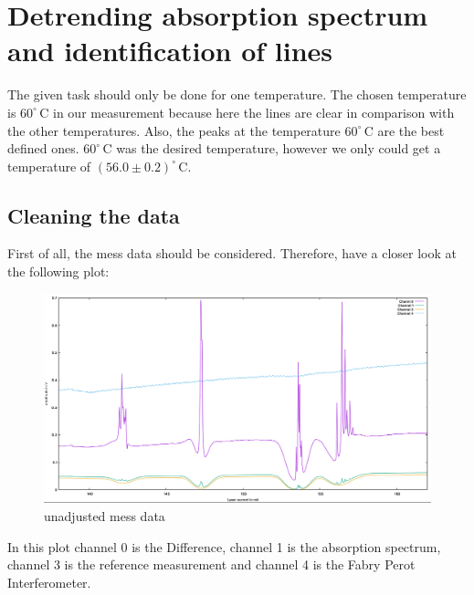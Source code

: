 \section{Detrending absorption spectrum and identification of lines}
The given task should only be done for one temperature. The chosen temperature is $60^\circ\,$C in our measurement because here 
the lines are clear in comparison with the other temperatures. Also, the peaks at the temperature $60^\circ\,$C are the best defined ones. 
$60^\circ\,$C was the desired temperature, however we only could get a temperature of $(56.0\pm 0.2)^\circ\,$C.\\
\subsection{Cleaning the data}
First of all, the mess data should be considered. Therefore, have a closer look at the following plot:\\
\begin{center}
    \begin{figure}[h]
        \centering
        \includegraphics[scale=0.4]{Bilder/Auswertung_Anna/L_normal.png}
        \caption{unadjusted mess data}
        \label{fig:unadjusted}
    \end{figure}
\end{center}
In this plot channel 0 is the Difference, channel 1 is the absorption spectrum, channel 3 is the reference measurement and
channel 4 is the Fabry Perot Interferometer.\\

